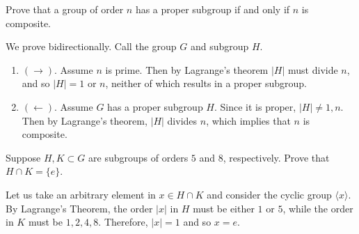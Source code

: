   \begin{exercise}[Shifrin 6.3.11]
    Prove that a group of order $n$ has a proper subgroup if and only if $n$ is composite.
  \end{exercise}
  \begin{solution}
    We prove bidirectionally. Call the group $G$ and subgroup $H$. 
    \begin{enumerate}
      \item $(\rightarrow)$. Assume $n$ is prime. Then by Lagrange's theorem $|H|$ must divide $n$, and so $|H| = 1$ or $n$, neither of which results in a proper subgroup. 
      \item $(\leftarrow)$. Assume $G$ has a proper subgroup $H$. Since it is proper, $|H| \neq 1, n$. Then by Lagrange's theorem, $|H|$ divides $n$, which implies that $n$ is composite. 
    \end{enumerate}
  \end{solution}

  \begin{exercise}[Shifrin 6.3.13]
    Suppose $H, K \subset G$ are subgroups of orders $5$ and $8$, respectively. Prove that $H \cap K = \{e\}$.
  \end{exercise}
  \begin{solution}
    Let us take an arbitrary element in $x \in H \cap K$ and consider the cyclic group $\langle x \rangle$. By Lagrange's Theorem, the order $|x|$ in $H$ must be either $1$ or $5$, while the order in $K$ must be $1, 2, 4, 8$. Therefore, $|x| = 1$ and so $x = e$. 
  \end{solution}

